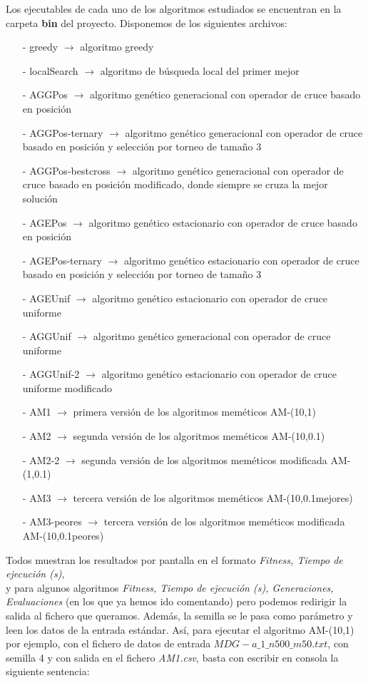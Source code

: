 \documentclass[10pt,a4paper]{article}
\begin{document}
	Los ejecutables de cada uno de los algoritmos estudiados se encuentran en la carpeta \textbf{bin} del proyecto. Disponemos de los siguientes archivos:
	\begin{itemize}
		\item [-] greedy $ \rightarrow $ algoritmo greedy
			\item [-] localSearch $ \rightarrow $  algoritmo de búsqueda local del primer mejor
			\item [-] AGGPos $ \rightarrow $  algoritmo genético generacional con operador de cruce basado en posición
			\item [-] AGGPos-ternary $ \rightarrow $  algoritmo genético generacional con operador de cruce basado en posición y selección por torneo de tamaño 3
			\item [-] AGGPos-bestcross $ \rightarrow $  algoritmo genético generacional con operador de cruce basado en posición modificado, donde siempre se cruza la mejor solución
			\item [-] AGEPos $ \rightarrow $  algoritmo genético estacionario con operador de cruce basado en posición
			\item [-] AGEPos-ternary $ \rightarrow $  algoritmo genético estacionario con operador de cruce basado en posición y selección por torneo de tamaño 3
			\item [-] AGEUnif $ \rightarrow $  algoritmo genético estacionario con operador de cruce uniforme
			\item [-] AGGUnif $ \rightarrow $  algoritmo genético generacional con operador de cruce uniforme
			\item [-] AGGUnif-2 $ \rightarrow $  algoritmo genético estacionario con operador de cruce uniforme modificado
			\item [-] AM1 $ \rightarrow $  primera versión de los algoritmos meméticos AM-(10,1)
			\item [-] AM2 $ \rightarrow $  segunda versión de los algoritmos meméticos AM-(10,0.1)
			\item [-] AM2-2 $ \rightarrow $  segunda versión de los algoritmos meméticos modificada AM-(1,0.1)
			\item [-] AM3 $ \rightarrow $  tercera versión de los algoritmos meméticos AM-(10,0.1mejores)
			\item [-] AM3-peores $ \rightarrow $  tercera versión de los algoritmos meméticos modificada AM-(10,0.1peores)
			
	\end{itemize}
	
	Todos muestran los resultados por pantalla en el formato \textit{Fitness, Tiempo de ejecución (s)},\\ y para algunos algoritmos \textit{Fitness, Tiempo de ejecución (s), Generaciones, Evaluaciones} (en los que ya hemos ido comentando) pero podemos redirigir la salida al fichero que queramos. Además, la semilla se le pasa como parámetro y leen los datos  de la entrada estándar. Así, para ejecutar el algoritmo AM-(10,1) por ejemplo, con el fichero de datos de entrada $MDG-a\_1\_n500\_m50.txt$, con semilla 4 y con salida en el fichero \textit{AM1.csv}, basta con escribir en consola la siguiente sentencia:
	
\end{document}
